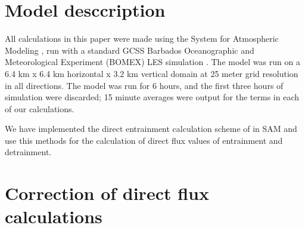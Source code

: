 \documentclass[draft,grl]{agutex}
\begin{document}
\begin{article}

\section{Model desccription}

All calculations in this paper were made using the System for Atmospheric 
Modeling \citep[SAM;][]{Khairoutdinov2003}, run with a standard GCSS Barbados 
Oceanographic and Meteorological Experiment (BOMEX) LES simulation 
\citep{Holland1973, Siebesma2003}.  The model was run on a 6.4 km x 6.4 km 
horizontal x 3.2 km vertical domain at 25 meter grid resolution in all 
directions.  The model was run for 6 hours, and the first three hours 
of simulation were discarded; 15 minute averages were output for the terms 
in each of our calculations.  

We have implemented the direct entrainment calculation scheme of 
\cite{Romps2010} in SAM and use this methods for the calculation of direct flux 
values of entrainment and detrainment.

\section{Correction of direct flux calculations}


\end{article}
\end{document}
